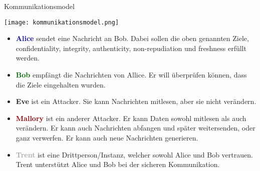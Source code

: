 \begin{definition}{Kommunikationsmodel}

    \texttt{[image: kommunikationsmodel.png]}

    \begin{itemize}
        \item \textcolor{darkblue}{\textbf{Alice}} sendet eine Nachricht an Bob. Dabei sollen die oben genannten Ziele, confidentiality, integrity, authenticity, non-repudiation und freshness erfüllt werden.
        \item \textcolor{darkgreen}{\textbf{Bob}} empfängt die Nachrichten von Allice. Er will überprüfen können, dass die Ziele eingehalten wurden.
        \item \textcolor{darktangerine}{\textbf{Eve}}  ist ein Attacker. Sie kann Nachrichten mitlesen, aber sie nicht verändern.
        \item \textcolor{darkred}{\textbf{Mallory}} ist ein anderer Attacker. Er kann Daten sowohl mitlesen als auch verändern. Er kann auch Nachrichten abfangen und später weitersenden, oder ganz verwerfen. Er kann auch neue Nachrichten generieren.
        \item \textcolor{darkgrey}{\textbf{Trent}} ist eine Drittperson/Instanz, welcher sowohl Alice und Bob vertrauen. Trent unterstützt Alice und Bob bei der sicheren Kommunikation.
    \end{itemize}
\end{definition}

